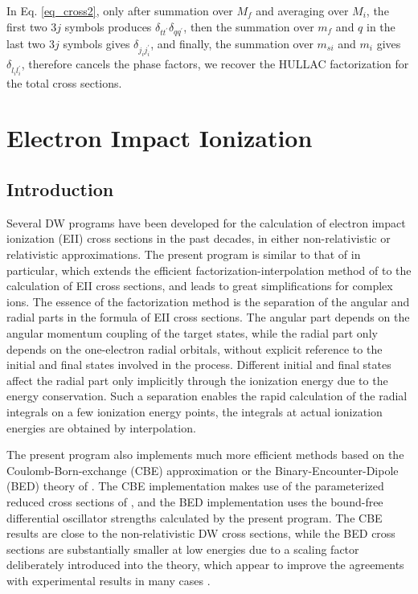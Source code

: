 In Eq. \ref{eq_cross2},
only after summation over $M_f$ and averaging over $M_i$, the first two 
$3j$ symbols produces $\delta_{tt^\prime}\delta_{qq^\prime}$, then
the summation over $m_f$ and $q$ in the last two $3j$ symbols gives
$\delta_{j_i j_i^\prime}$, and finally, the summation over $m_{si}$ and
$m_i$ gives $\delta_{l_i l_i^\prime}$,
therefore cancels the phase factors, we recover the HULLAC factorization 
for the total cross sections.

\section{Electron Impact Ionization}
\subsection{Introduction}
Several DW programs have been developed for the calculation of electron impact
ionization (EII) cross sections in the past decades, in either non-relativistic
\cite{younger:1980a} or relativistic \cite{pindzola:1988a, sampson:1992a}
approximations. The present program is similar to that of \citet{sampson:1992a}
in particular,  which extends the efficient factorization-interpolation method
of \citet{barshalom:1988a} to the calculation of EII cross sections, and leads
to great simplifications for complex ions. The essence of the factorization
method is the separation of the angular and radial parts in the formula of EII
cross sections. The angular part depends on the angular momentum coupling of the
target states, while the radial part only depends on the one-electron radial
orbitals, without explicit reference to the initial and final states involved in
the process. Different initial and final states affect the radial part only
implicitly through the ionization energy due to the energy conservation. Such a
separation enables the rapid calculation of the radial integrals on a few
ionization energy points, the integrals at actual ionization energies are
obtained by interpolation.  

The present program also implements much more efficient methods based on the
Coulomb-Born-exchange (CBE) approximation or the Binary-Encounter-Dipole (BED)
theory of \citet{kim:1994a}. The CBE implementation makes use of the
parameterized reduced cross sections of \citet{golden:1977a, golden:1980a}, and
the BED implementation uses the bound-free differential oscillator strengths
calculated by the present program. The CBE results are close to the
non-relativistic DW cross sections, while the BED cross sections are
substantially smaller at low energies due to a scaling factor deliberately
introduced into the theory, which appear to improve the agreements with
experimental results in many cases \cite{kim:1994a}.
 
